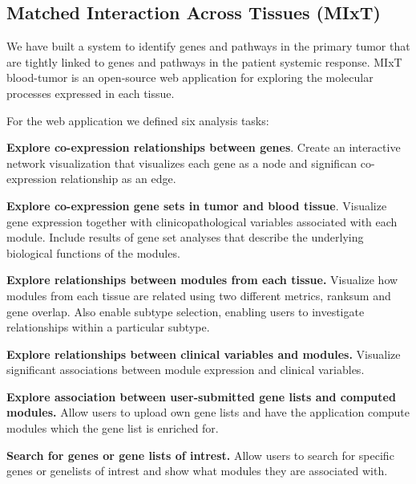 \subsection*{Matched Interaction Across Tissues (MIxT)}
We have built a system to identify genes and pathways in the primary tumor that
are tightly linked to genes and pathways in the patient systemic
response\cite{dumeaux2017}. MIxT blood-tumor is an open-source web application
for exploring the molecular processes expressed in each tissue. 

For the web application we defined six analysis tasks: 

\textbf{Explore co-expression relationships between genes}. Create an
interactive network visualization that visualizes each gene as a node and
significan co-expression relationship as an edge. 

\textbf{Explore co-expression gene sets in tumor and blood tissue}.
Visualize gene expression together with clinicopathological variables associated
with each module. Include results of gene set analyses that describe the
underlying biological functions of the modules. 

\textbf{Explore relationships between modules from each tissue.}
Visualize how modules from each tissue are related using two different
metrics, ranksum and gene overlap. Also enable subtype selection,
enabling users to investigate relationships within a particular subtype. 

\textbf{Explore relationships between clinical variables and modules.}
Visualize significant associations between module expression and
clinical variables.

\textbf{Explore association between user-submitted gene lists and computed
modules.} Allow users to upload own gene lists and have the application compute
modules which the gene list is enriched for. 

\textbf{Search for genes or gene lists of intrest.} Allow users to search
for specific genes or genelists of intrest and show what modules they are
associated with. 

